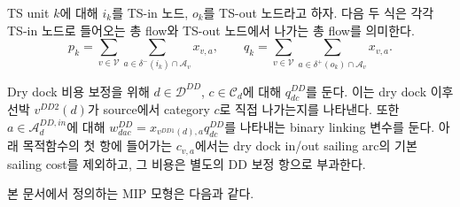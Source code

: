 \documentclass[11pt]{article}
\newcommand{\Vessels}{\mathcal{V}}
\newcommand{\Arcs}{\mathcal{A}}
\newcommand{\DD}{\mathcal{D}^{DD}}
\newcommand{\out}{\delta^+}
\newcommand{\inb}{\delta^-}
\begin{document}
TS unit $k$에 대해 $i_k$를 TS-in 노드, $o_k$를 TS-out 노드라고 하자. 다음
두 식은 각각 TS-in 노드로 들어오는 총 flow와 TS-out 노드에서 나가는 총 flow를
의미한다.
\[
  p_k =
  \sum_{v\in\Vessels}\sum_{a\in\inb(i_k)\cap\Arcs_v} x_{v,a},
  \qquad
  q_k =
  \sum_{v\in\Vessels}\sum_{a\in\out(o_k)\cap\Arcs_v} x_{v,a}.
\]

Dry dock 비용 보정을 위해 $d\in\DD$, $c\in\mathcal{C}_d$에 대해
$q^{DD}_{dc}$를 둔다. 이는 dry dock 이후 선박 $v^{DD2}(d)$가 source에서 category
$c$로 직접 나가는지를 나타낸다. 또한 $a\in\Arcs^{DD,in}_d$에 대해
$w^{DD}_{dac}=x_{v^{DD1}(d),a}q^{DD}_{dc}$를 나타내는 binary linking 변수를 둔다.
아래 목적함수의 첫 항에 들어가는 $c_{v,a}$에서는 dry dock in/out sailing arc의
기본 sailing cost를 제외하고, 그 비용은 별도의 DD 보정 항으로 부과한다.

본 문서에서 정의하는 MIP 모형은 다음과 같다.
\end{document}

